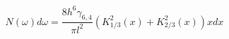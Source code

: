\begin{equation}
N(\omega) d\omega = \frac{8h^6\gamma_{6,4}}{\pi l^2} (K_{1/3}^2(x) +
K_{2/3}^2(x)) x dx
\end{equation}

